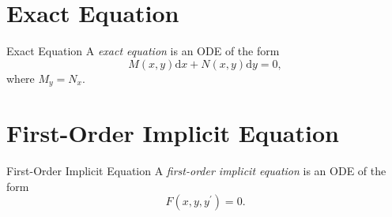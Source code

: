 \section{Exact Equation}

\begin{definition}{Exact Equation}{}
  A \emph{exact equation} is an ODE of the form
  \begin{equation}
    M(x,y)\mathrm{d} x + N(x,y)\mathrm{d} y = 0,
  \end{equation}
  where $M_y = N_x$.
\end{definition}

\section{First-Order Implicit Equation}

\begin{definition}{First-Order Implicit Equation}{}
  A \emph{first-order implicit equation} is an ODE of the form
  \begin{equation}
    F(x, y, y^{\prime}) = 0.
  \end{equation}
\end{definition}






